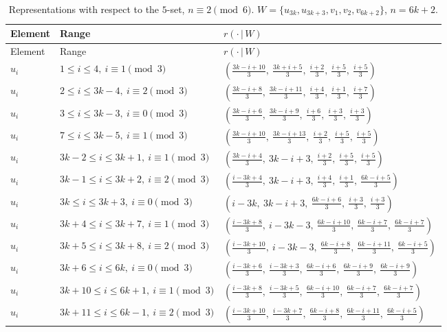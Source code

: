 \begin{longtable}{lll}
\caption{Representations with respect to the $5$-set, $n\equiv 2 \pmod 6$. $W=\{u_{3k}, u_{3k+3}, v_{1}, v_{2}, v_{6k+2}\}$, $n=6k+2$.}\label{tab:W52}\\
\hline Element & Range & $r(\cdot\,|\,W)$ \\ \hline
\endfirsthead
\hline Element & Range & $r(\cdot\,|\,W)$ \\ \hline
\endhead
$u_i$ & $1 \le i \le 4,\ i \equiv 1 \pmod{3}$ & $(\frac{3k-i+10}{3},\ \frac{3k+i+5}{3},\ \frac{i+2}{3},\ \frac{i+5}{3},\ \frac{i+5}{3})$ \\
$u_i$ & $2 \le i \le 3k-4,\ i \equiv 2 \pmod{3}$ & $(\frac{3k-i+8}{3},\ \frac{3k-i+11}{3},\ \frac{i+4}{3},\ \frac{i+1}{3},\ \frac{i+7}{3})$ \\
$u_i$ & $3 \le i \le 3k-3,\ i \equiv 0 \pmod{3}$ & $(\frac{3k-i+6}{3},\ \frac{3k-i+9}{3},\ \frac{i+6}{3},\ \frac{i+3}{3},\ \frac{i+3}{3})$ \\
$u_i$ & $7 \le i \le 3k-5,\ i \equiv 1 \pmod{3}$ & $(\frac{3k-i+10}{3},\ \frac{3k-i+13}{3},\ \frac{i+2}{3},\ \frac{i+5}{3},\ \frac{i+5}{3})$ \\
$u_i$ & $3k-2 \le i \le 3k+1,\ i \equiv 1 \pmod{3}$ & $(\frac{3k-i+4}{3},\ 3k-i+3,\ \frac{i+2}{3},\ \frac{i+5}{3},\ \frac{i+5}{3})$ \\
$u_i$ & $3k-1 \le i \le 3k+2,\ i \equiv 2 \pmod{3}$ & $(\frac{i-3k+4}{3},\ 3k-i+3,\ \frac{i+4}{3},\ \frac{i+1}{3},\ \frac{6k-i+5}{3})$ \\
$u_i$ & $3k \le i \le 3k+3,\ i \equiv 0 \pmod{3}$ & $(i-3k,\ 3k-i+3,\ \frac{6k-i+6}{3},\ \frac{i+3}{3},\ \frac{i+3}{3})$ \\
$u_i$ & $3k+4 \le i \le 3k+7,\ i \equiv 1 \pmod{3}$ & $(\frac{i-3k+8}{3},\ i-3k-3,\ \frac{6k-i+10}{3},\ \frac{6k-i+7}{3},\ \frac{6k-i+7}{3})$ \\
$u_i$ & $3k+5 \le i \le 3k+8,\ i \equiv 2 \pmod{3}$ & $(\frac{i-3k+10}{3},\ i-3k-3,\ \frac{6k-i+8}{3},\ \frac{6k-i+11}{3},\ \frac{6k-i+5}{3})$ \\
$u_i$ & $3k+6 \le i \le 6k,\ i \equiv 0 \pmod{3}$ & $(\frac{i-3k+6}{3},\ \frac{i-3k+3}{3},\ \frac{6k-i+6}{3},\ \frac{6k-i+9}{3},\ \frac{6k-i+9}{3})$ \\
$u_i$ & $3k+10 \le i \le 6k+1,\ i \equiv 1 \pmod{3}$ & $(\frac{i-3k+8}{3},\ \frac{i-3k+5}{3},\ \frac{6k-i+10}{3},\ \frac{6k-i+7}{3},\ \frac{6k-i+7}{3})$ \\
$u_i$ & $3k+11 \le i \le 6k-1,\ i \equiv 2 \pmod{3}$ & $(\frac{i-3k+10}{3},\ \frac{i-3k+7}{3},\ \frac{6k-i+8}{3},\ \frac{6k-i+11}{3},\ \frac{6k-i+5}{3})$ \\

\end{longtable}
